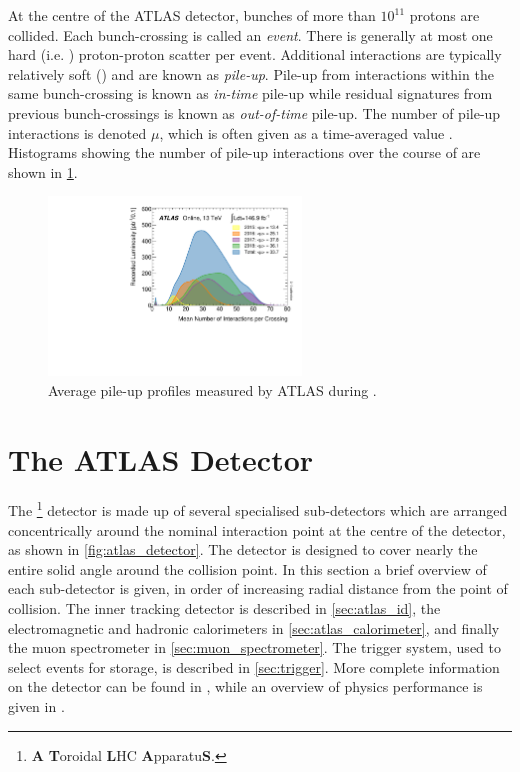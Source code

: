 At the centre of the ATLAS detector, bunches of more than $10^{11}$ protons are collided.
Each bunch-crossing is called an \textit{event}.
There is generally at most one hard (i.e. \highpt) proton-proton scatter per event.
Additional interactions are typically relatively soft (\lowpt) and are known as \textit{pile-up}.
Pile-up from interactions within the same bunch-crossing is known as \textit{in-time} pile-up while residual signatures from previous bunch-crossings is known as \textit{out-of-time} pile-up.
The number of pile-up interactions is denoted $\mu$, which is often given as a time-averaged value \angles{\mu}.
Histograms showing the number of pile-up interactions over the course of \runtwo are shown in \cref{fig:run2_pile-up}.
%
\begin{figure}[!htbp]
  \centering
  \includegraphics[width=0.6\textwidth]{chapters/2.detector/figs/mu_2015_2018.pdf}
  \caption{
    Average pile-up profiles measured by ATLAS during \runtwo \cite{atlas-lumi-run2}.
  }
  \label{fig:run2_pile-up}
\end{figure}
%


\section{The ATLAS Detector}\label{sec:atlas_detector}

The \ATLAS\footnote{\textbf{A} \textbf{T}oroidal \textbf{L}HC \textbf{A}pparatu\textbf{S}.} detector is made up of several specialised sub-detectors which are arranged concentrically around the nominal interaction point at the centre of the detector, as shown in \cref{fig:atlas_detector}.
The detector is designed to cover nearly the entire solid angle around the collision point.
In this section a brief overview of each sub-detector is given, in order of increasing radial distance from the point of collision.
The inner tracking detector is described in \cref{sec:atlas_id}, the electromagnetic and hadronic calorimeters in \cref{sec:atlas_calorimeter}, and finally the muon spectrometer in \cref{sec:muon_spectrometer}.
The trigger system, used to select events for storage, is described in \cref{sec:trigger}.
More complete information on the detector can be found in , while an overview of physics performance is given in \cite{ATLAS-TDR-14}.

